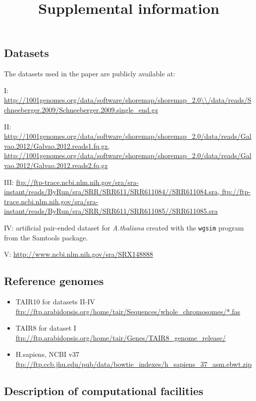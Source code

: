\documentclass[11pt]{article}
\begin{document}
\title{Supplemental information}
\author{}
\date{}
\maketitle

\subsection*{Datasets}

The datasets used in the paper are publicly available at:

I: \url{http://1001genomes.org/data/software/shoremap/shoremap\_2.0\\/data/reads/Schneeberger.2009/Schneeberger.2009.single\_end.gz}

II: \url{http://1001genomes.org/data/software/shoremap/shoremap\_2.0/data/reads/Galvao.2012/Galvao.2012.reads1.fq.gz, http://1001genomes.org/data/software/shoremap/shoremap\_2.0/data/reads/Galvao.2012/Galvao.2012.reads2.fq.gz}	

III: \url{ftp://ftp-trace.ncbi.nlm.nih.gov/sra/sra-instant/reads/ByRun/sra/SRR/SRR611/SRR611084//SRR611084.sra, ftp://ftp-trace.ncbi.nlm.nih.gov/sra/sra-instant/reads/ByRun/sra/SRR/SRR611/SRR611085//SRR611085.sra}

IV: artificial pair-ended dataset for {\it A.thaliana} created with the {\tt wgsim} program from the Samtools package.

V: \url{http://www.ncbi.nlm.nih.gov/sra/SRX148888}


\subsection*{Reference genomes}
\begin{itemize}
\item TAIR10 for datasets II-IV \url{ftp://ftp.arabidopsis.org/home/tair/Sequences/whole\_chromosomes/*.fas}
\item TAIR8 for dataset I \url{ftp://ftp.arabidopsis.org/home/tair/Genes/TAIR8\_genome\_release/}
\item H.sapiens, NCBI v37 \url{ftp://ftp.ccb.jhu.edu/pub/data/bowtie\_indexes/h\_sapiens\_37\_asm.ebwt.zip}
\end{itemize}

\subsection*{Description of computational facilities}
\end{document}
